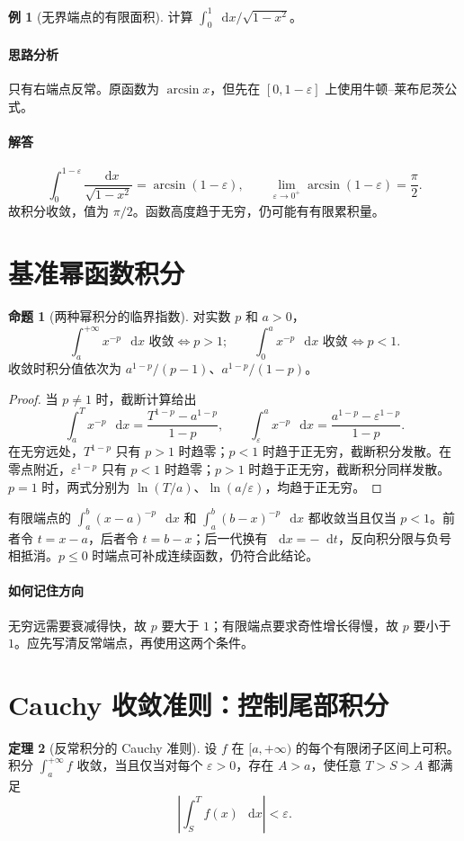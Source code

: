 \documentclass[UTF8,fontset=fandol,12pt,oneside,openany]{ctexrep}
\newcommand{\dd}{\mathop{}\!\mathrm d}
\theoremstyle{definition}
\newtheorem{theorem}{定理}[chapter]
\newtheorem{proposition}[theorem]{命题}
\newtheorem{example}{例}[chapter]
\begin{document}
\begin{example}[无界端点的有限面积]
计算 $\int_0^1\dd x/\sqrt{1-x^2}$。
\end{example}
\paragraph{思路分析} 只有右端点反常。原函数为 $\arcsin x$，但先在 $[0,1-\varepsilon]$ 上使用牛顿--莱布尼茨公式。
\paragraph{解答}
\[
\int_0^{1-\varepsilon}\frac{\dd x}{\sqrt{1-x^2}}
=\arcsin(1-\varepsilon),\qquad
\lim_{\varepsilon\to0^+}\arcsin(1-\varepsilon)=\frac\pi2.
\]
故积分收敛，值为 $\pi/2$。函数高度趋于无穷，仍可能有有限累积量。

\section{基准幂函数积分}
\label{lec:13:p-integrals}
\begin{proposition}[两种幂积分的临界指数]
对实数 $p$ 和 $a>0$，
\[
\int_a^{+\infty}x^{-p}\,\dd x\text{ 收敛}\iff p>1;
\qquad
\int_0^a x^{-p}\,\dd x\text{ 收敛}\iff p<1.
\]
收敛时积分值依次为 $a^{1-p}/(p-1)$、$a^{1-p}/(1-p)$。
\end{proposition}
\begin{proof}
当 $p\ne1$ 时，截断计算给出
\[
\int_a^T x^{-p}\,\dd x=\frac{T^{1-p}-a^{1-p}}{1-p},
\qquad
\int_\varepsilon^a x^{-p}\,\dd x
=\frac{a^{1-p}-\varepsilon^{1-p}}{1-p}.
\]
在无穷远处，$T^{1-p}$ 只有 $p>1$ 时趋零；$p<1$ 时趋于正无穷，截断积分发散。在零点附近，$\varepsilon^{1-p}$ 只有 $p<1$ 时趋零；$p>1$ 时趋于正无穷，截断积分同样发散。$p=1$ 时，两式分别为 $\ln(T/a)$、$\ln(a/\varepsilon)$，均趋于正无穷。
\end{proof}
有限端点的 $\int_a^b(x-a)^{-p}\,\dd x$ 和 $\int_a^b(b-x)^{-p}\,\dd x$ 都收敛当且仅当 $p<1$。前者令 $t=x-a$，后者令 $t=b-x$；后一代换有 $\dd x=-\dd t$，反向积分限与负号相抵消。$p\le0$ 时端点可补成连续函数，仍符合此结论。

\paragraph{如何记住方向} 无穷远需要衰减得快，故 $p$ 要大于 $1$；有限端点要求奇性增长得慢，故 $p$ 要小于 $1$。应先写清反常端点，再使用这两个条件。

\section{Cauchy 收敛准则：控制尾部积分}
\label{lec:13:cauchy}
\begin{theorem}[反常积分的 Cauchy 准则]
设 $f$ 在 $[a,+\infty)$ 的每个有限闭子区间上可积。积分 $\int_a^{+\infty}f$ 收敛，当且仅当对每个 $\varepsilon>0$，存在 $A>a$，使任意 $T>S>A$ 都满足
\[
 \left|\int_S^T f(x)\,\dd x\right|<\varepsilon.
\]
\end{theorem}
\end{document}
